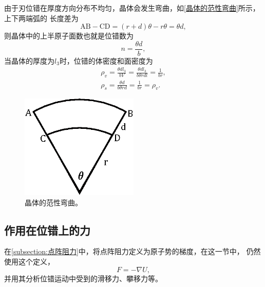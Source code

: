             由于刃位错在厚度方向分布不均匀，晶体会发生弯曲，如\autoref{晶体的范性弯曲}所示，上下两端弧的
            长度差为
            \begin{equation}
                \mathrm{AB}-\mathrm{CD}=(r+d)\theta-r\theta=\theta d,
            \end{equation}
            则晶体中的上半原子面数也就是位错数为
            \begin{equation}
                n=\frac{\theta d}{b},
            \end{equation}
            当晶体的厚度为$l_3$时，位错的体密度和面密度为
            \begin{align}
                \rho_v=\frac{\theta dl_3}{bV}=\frac{\theta dl_3}{b\theta rdl}=\frac{1}{br},\\
                \rho_s=\frac{\theta d}{b\theta rd}=\frac{1}{br}=\rho_v.
            \end{align}
            \begin{figure}[ht]
                \centering
                \includegraphics[width=0.5\textwidth]{fig/bending_of_crystal_for_dislocation.eps}
                \caption{晶体的范性弯曲。}
                \label{晶体的范性弯曲}
            \end{figure}

            \subsection{作用在位错上的力}
                在\autoref{subsection:点阵阻力}中，将点阵阻力定义为原子势的梯度，在这一节中，
                仍然使用这个定义，
                \begin{equation}
                    F=-\nabla U\label{位错力的定义},
                \end{equation}
                并用其分析位错运动中受到的滑移力、攀移力等。
                
